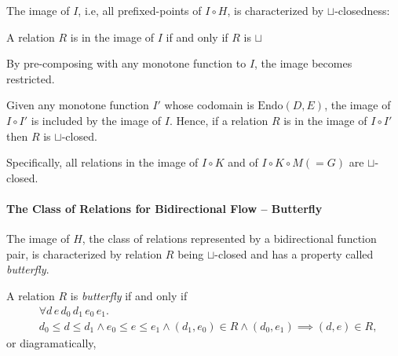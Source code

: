 \documentclass{llncs}
\newcommand{\Endo}{\mathrm{Endo}}
\newcommand{\join}{\sqcup}
\newcommand{\comp}{\circ}
\newcommand{\rotleq}{\rotatebox[origin=c]{90}{$\leq$}}
\begin{document}
  The image of $I$, i.e, all prefixed-points of $I \comp H$, is characterized by $\join$-closedness:
  \begin{theorem}\label{thm:join-closed}
    A relation $R$ is in the image of $I$ if and only if $R$ is $\join$ 
  \end{theorem}


  By pre-composing with any monotone function to $I$, the image becomes restricted.
  \begin{proposition} \label{pr:restriction-subset}
    Given any monotone function $I'$ whose codomain is $\Endo(D, E)$, the image of $I \comp I'$ is included by the image of $I$.
    Hence, if a relation $R$ is in the image of $I \comp I'$ then $R$ is $\join$-closed.
  \end{proposition}
  Specifically, all relations in the image of $I \comp K$ and of $I \comp K \comp M (= G)$ are $\join$-closed.

  \paragraph{The Class of Relations for Bidirectional Flow -- Butterfly}
  The image of $H$, the class of relations represented by a bidirectional function pair, is characterized by relation $R$ being $\join$-closed and has a property called \emph{butterfly}.

  \begin{definition}
    A relation $R$ is \emph{butterfly} if and only if \begin{align*}
      &\forall d\, e\, d_{0}\, d_{1 }\, e_{0}\, e_{1} .\\
      &d_{0} \leq d \leq d_{1} \land e_{0} \leq e \leq e_{1} \land (d_{1}, e_{0}) \in R \land (d_{0}, e_{1}) \implies (d, e) \in R,
    \end{align*}or diagramatically, \quad
  \end{definition}
\end{document}
